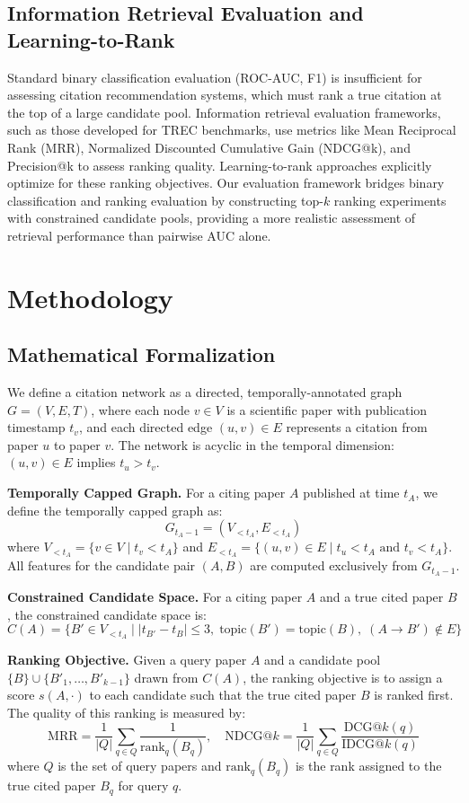 \documentclass[11pt,a4paper]{article}
\begin{document}
\subsection{Information Retrieval Evaluation and Learning-to-Rank}
Standard binary classification evaluation (ROC-AUC, F1) is insufficient for assessing citation recommendation systems, which must rank a true citation at the top of a large candidate pool. Information retrieval evaluation frameworks, such as those developed for TREC benchmarks, use metrics like Mean Reciprocal Rank (MRR), Normalized Discounted Cumulative Gain (NDCG@k), and Precision@k to assess ranking quality. Learning-to-rank approaches \citep{bhagavatula2018content} explicitly optimize for these ranking objectives. Our evaluation framework bridges binary classification and ranking evaluation by constructing top-$k$ ranking experiments with constrained candidate pools, providing a more realistic assessment of retrieval performance than pairwise AUC alone.

\section{Methodology}
\label{sec:method}

\subsection{Mathematical Formalization}
We define a citation network as a directed, temporally-annotated graph $G = (V, E, T)$, where each node $v \in V$ is a scientific paper with publication timestamp $t_v$, and each directed edge $(u, v) \in E$ represents a citation from paper $u$ to paper $v$. The network is acyclic in the temporal dimension: $(u, v) \in E$ implies $t_u > t_v$.

\textbf{Temporally Capped Graph.} For a citing paper $A$ published at time $t_A$, we define the temporally capped graph as:
\[
G_{t_A-1} = (V_{<t_A}, E_{<t_A})
\]
where $V_{<t_A} = \{v \in V \mid t_v < t_A\}$ and $E_{<t_A} = \{(u,v) \in E \mid t_u < t_A \text{ and } t_v < t_A\}$. All features for the candidate pair $(A, B)$ are computed exclusively from $G_{t_A-1}$.

\textbf{Constrained Candidate Space.} For a citing paper $A$ and a true cited paper $B$, the constrained candidate space is:
\[
C(A) = \{B' \in V_{<t_A} \mid |t_{B'} - t_B| \le 3, \; \text{topic}(B') = \text{topic}(B), \; (A \to B') \notin E\}
\]

\textbf{Ranking Objective.} Given a query paper $A$ and a candidate pool $\{B\} \cup \{B'_1, \ldots, B'_{k-1}\}$ drawn from $C(A)$, the ranking objective is to assign a score $s(A, \cdot)$ to each candidate such that the true cited paper $B$ is ranked first. The quality of this ranking is measured by:
\[
\text{MRR} = \frac{1}{|Q|}\sum_{q \in Q} \frac{1}{\text{rank}_q(B_q)}, \quad \text{NDCG@}k = \frac{1}{|Q|}\sum_{q \in Q} \frac{\text{DCG@}k(q)}{\text{IDCG@}k(q)}
\]
where $Q$ is the set of query papers and $\text{rank}_q(B_q)$ is the rank assigned to the true cited paper $B_q$ for query $q$.
\end{document}
